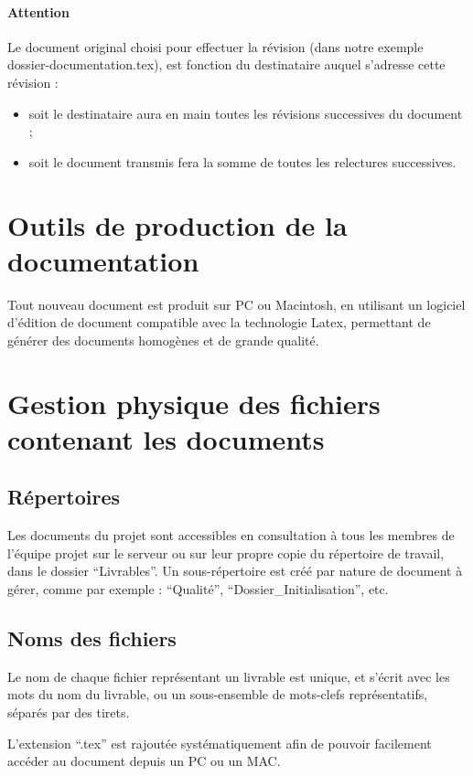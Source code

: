 \documentclass[a4paper]{article}
\begin{document}
\paragraph{Attention} Le document original choisi pour effectuer la révision (dans notre exemple dossier-documentation.tex), est fonction du destinataire auquel s'adresse cette révision :

\begin{itemize}
\item soit le destinataire aura en main toutes les révisions successives du document ;
\item soit le document transmis fera la somme de toutes les relectures successives.
\end{itemize}


\section{Outils de production de la documentation}

Tout nouveau document est produit sur PC ou Macintosh, en utilisant un logiciel d'édition de document compatible avec la technologie Latex, permettant de générer des documents homogènes et de grande qualité.

\section{Gestion physique des fichiers contenant les documents}

\subsection{Répertoires}

Les documents du projet sont accessibles en consultation à tous les membres de l'équipe projet sur le serveur ou sur leur propre copie du répertoire de travail, dans le dossier ``Livrables''. Un sous-répertoire est créé par nature de document à gérer, comme par exemple : ``Qualité'', ``Dossier\_Initialisation'', etc.

\subsection{Noms des fichiers}

Le nom de chaque fichier représentant un livrable est unique, et s'écrit avec les mots du nom du livrable, ou un sous-ensemble de mots-clefs représentatifs, séparés par des tirets.

L'extension ``.tex'' est rajoutée systématiquement afin de pouvoir facilement accéder au document depuis un PC ou un MAC.
\end{document}
